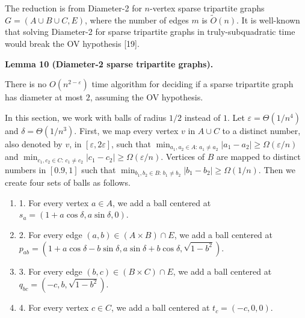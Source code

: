 \documentclass[10pt,a4paper]{article}
\begin{document}
The reduction is from Diameter-2 for $n$-vertex sparse tripartite graphs $G=(A\cup B\cup C,E)$, where the number of edges $m$ is $\tilde{O}(n)$. It is well-known that solving Diameter-2 for sparse tripartite graphs in truly-subquadratic time would break the OV hypothesis [19].
\par
\par
\par\medskip\noindent\textbf{Lemma 10 (Diameter-2 sparse tripartite graphs).}\par
There is no $O(n^{2-\varepsilon})$ time algorithm for deciding if a sparse tripartite graph has diameter at most $2$, assuming the OV hypothesis.
\par
\par
\par
In this section, we work with balls of radius $1/2$ instead of $1$. Let $\varepsilon=\Theta(1/n^{4})$ and $\delta=\Theta(1/n^{3})$. First, we map every vertex $v$ in $A\cup C$ to a distinct number, also denoted by $v$, in $[\varepsilon,2\varepsilon]$, such that $\min_{a_{1},a_{2}\in A:\,a_{1}\neq a_{2}}|a_{1}-a_{2}|\geq\Omega(\varepsilon/n)$ and $\min_{c_{1},c_{2}\in C:\,c_{1}\neq c_{2}}|c_{1}-c_{2}|\geq\Omega(\varepsilon/n)$. Vertices of $B$ are mapped to distinct numbers in $[0.9,1]$ such that $\min_{b_{1},b_{2}\in B:\,b_{1}\neq b_{2}}|b_{1}-b_{2}|\geq\Omega(1/n)$. Then we create four sets of balls as follows.
\par
\par
\begin{enumerate}
\item[]  1. 
For every vertex $a\in A$, we add a ball centered at $s_{a}=(1+a\cos\delta,a\sin\delta,0)$.
\par
\par
\item[]  2. 
For every edge $(a,b)\in(A\times B)\cap E$, we add a ball centered at $p_{ab}=(1+a\cos\delta-b\sin\delta,a\sin\delta+b\cos\delta,\sqrt{1-b^{2}})$.
\par
\par
\item[]  3. 
For every edge $(b,c)\in(B\times C)\cap E$, we add a ball centered at $q_{bc}=(-c,b,\sqrt{1-b^{2}})$.
\par
\par
\item[]  4. 
For every vertex $c\in C$, we add a ball centered at $t_{c}=(-c,0,0)$.
\par
\par
\end{enumerate}
\end{document}

